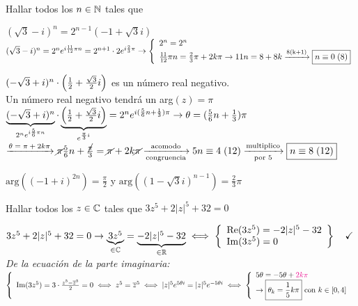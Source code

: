 \ejercicio
Hallar todos los $n \en \naturales$ tales que
\begin{enumerate}[label=\roman*)]
	\begin{minipage}{0.7\textwidth}
		\item $(\sqrt3 -i)^n = 2^{n-1}(-1 + \sqrt3 i)$ \\
		\separadorCorto
		$(\sqrt3 -i)^n = 2^n e^{i\frac{11}{12}\pi n} = 2^{n+1}\cdot 2e^{i \frac{2}{3} \pi}\\
			\to
			\llave{l}{
				2^n = 2^n\\
				\frac{11}{12}\pi n = \frac{2}{3}\pi + 2k \pi \to 11n = 8+8k \flecha{8(k+1)} \boxed{\congruencia{n}{0}{8}}
			}$
	\end{minipage}


	\item $(-\sqrt3 + i)^n \cdot \parentesis{\frac{1}{2} + \frac{\sqrt3}{2}i}$ es un número real negativo.\\
	      \separadorCorto
	      Un número real negativo tendrá un arg$(z) = \pi$\\
	      $\ub{(-\sqrt3 + i)^n}{2^ne^{i\frac{5}{6}\pi n}} \cdot \ub{\parentesis{\frac{1}{2} + \frac{\sqrt3}{2}i}}{e^{\frac{\pi}{3}i}} =
		      2^ne^{i(\frac{5}{6}n + \frac{1}{3}) \pi} \to \theta = (\frac{5}{6}n + \frac{1}{3}) \pi $\\
	      $\flecha{$\theta = \pi + 2k\pi$}
		      \cancel\pi \frac{5}{6}n + \frac{\cancel\pi}{3} = \cancel\pi + 2k\cancel\pi
		      \flecha{acomodo}[congruencia]
		      \congruencia{5n}{4}{12}
		      \flecha{multiplico}[por 5]
		      \boxed{\congruencia{n}{8}{12}} $

	\item $\text{arg}((-1+i)^{2n}) = \frac{\pi}{2}$ y $\text{arg}((1-\sqrt3 i)^{n-1}) = \frac{2}{3}\pi$

	      \separadorCorto
\end{enumerate}

\setcounter{ejercicio}{8}

\ejercicio
Hallar todos los $z \en \complejos$ tales que $3z^5 + 2|z|^5 + 32 = 0$

\separadorCorto
$3 z^5 + 2|z|^5 +32 = 0
	\to
	\ub{3z^5}{\en \complejos} = \ub{-2|z|^5- 32}{\en \reales}
	\sisolosi
	\llaves{l}{
		\re(3z^5) =  -2|z|^5 - 32\\
		\im(3z^5) =  0
	} \Tilde$\\

\textit{De la ecuación de la parte imaginaria: }\\
$\llave{l}{
		\im(3z^5) = 3 \cdot \frac{z^5 - \conj z^5}{2} = 0
		\sisolosi
		z^5 = \conj z^5
		\sisolosi
		|z|^5 e^{5 \theta i} = |z|^5 e^{-5 \theta i}
		\sisolosi
		\llave{l}{
			5 \theta = -5 \theta + \magenta{2k\pi}\\
			\to \boxed{\theta_k = \frac{1}{5}k\pi} \text{ con } k \en [0,4]
		}
	}$\\


